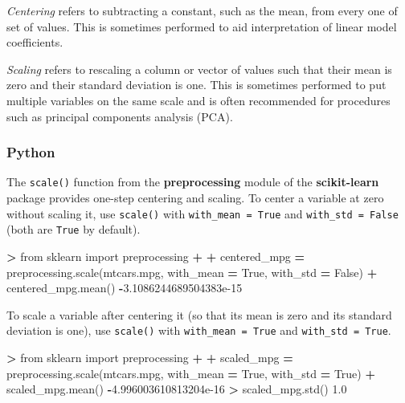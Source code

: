 \documentclass[
]{book}
\newenvironment{Shaded}{\begin{snugshade}}{\end{snugshade}}
\newcommand{\FloatTok}[1]{\textcolor[rgb]{0.00,0.00,0.81}{#1}}
\newcommand{\ImportTok}[1]{#1}
\newcommand{\NormalTok}[1]{#1}
\newcommand{\OperatorTok}[1]{\textcolor[rgb]{0.81,0.36,0.00}{\textbf{#1}}}
\newcommand{\VariableTok}[1]{\textcolor[rgb]{0.00,0.00,0.00}{#1}}
\begin{document}
\emph{Centering} refers to subtracting a constant, such as the mean, from every one of set of values. This is sometimes performed to aid interpretation of linear model coefficients.

\emph{Scaling} refers to rescaling a column or vector of values such that their mean is zero and their standard deviation is one. This is sometimes performed to put multiple variables on the same scale and is often recommended for procedures such as principal components analysis (PCA).

\hypertarget{python-40}{%
\subsubsection*{Python}\label{python-40}}

The \texttt{scale()} function from the \textbf{preprocessing} module of the \textbf{scikit-learn} package provides one-step centering and scaling. To center a variable at zero without scaling it, use \texttt{scale()} with \texttt{with\_mean\ =\ True} and \texttt{with\_std\ =\ False} (both are \texttt{True} by default).

\begin{Shaded}
\begin{Highlighting}[]
\OperatorTok{\textgreater{}} \ImportTok{from}\NormalTok{ sklearn }\ImportTok{import}\NormalTok{ preprocessing}
\OperatorTok{+} 
\OperatorTok{+}\NormalTok{ centered\_mpg }\OperatorTok{=}\NormalTok{ preprocessing.scale(mtcars.mpg, with\_mean }\OperatorTok{=} \VariableTok{True}\NormalTok{, with\_std }\OperatorTok{=} \VariableTok{False}\NormalTok{)}
\OperatorTok{+}\NormalTok{ centered\_mpg.mean()}
\OperatorTok{{-}}\FloatTok{3.1086244689504383e{-}15}
\end{Highlighting}
\end{Shaded}

To scale a variable after centering it (so that its mean is zero and its standard deviation is one), use \texttt{scale()} with \texttt{with\_mean\ =\ True} and \texttt{with\_std\ =\ True}.

\begin{Shaded}
\begin{Highlighting}[]
\OperatorTok{\textgreater{}} \ImportTok{from}\NormalTok{ sklearn }\ImportTok{import}\NormalTok{ preprocessing}
\OperatorTok{+} 
\OperatorTok{+}\NormalTok{ scaled\_mpg }\OperatorTok{=}\NormalTok{ preprocessing.scale(mtcars.mpg, with\_mean }\OperatorTok{=} \VariableTok{True}\NormalTok{, with\_std }\OperatorTok{=} \VariableTok{True}\NormalTok{)}
\OperatorTok{+}\NormalTok{ scaled\_mpg.mean()}
\OperatorTok{{-}}\FloatTok{4.996003610813204e{-}16}
\OperatorTok{\textgreater{}}\NormalTok{ scaled\_mpg.std()}
\FloatTok{1.0}
\end{Highlighting}
\end{Shaded}
\end{document}
